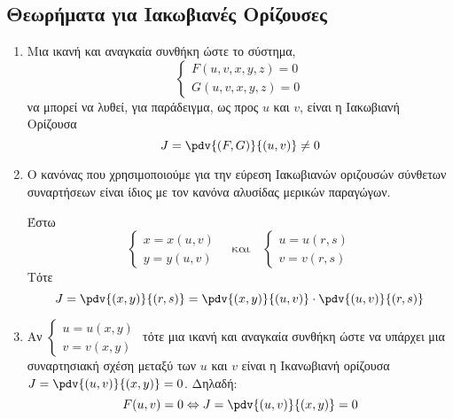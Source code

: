 \documentclass[a4paper,table]{report}
\begin{document}
\subsection{Θεωρήματα για Ιακωβιανές Ορίζουσες}

\begin{enumerate}
  \item Μια ικανή και αναγκαία συνθήκη ώστε το σύστημα, 
    \[
      \begin{cases}
        F(u,v,x,y,z) = 0 \\
        G(u,v,x,y,z) = 0
      \end{cases}
    \]
    να μπορεί να λυθεί, για παράδειγμα, ως προς 
    $u$ και $v$, είναι η Ιακωβιανή Ορίζουσα
    \[
      J = \pdv{(F,G)}{(u,v)} \neq 0 
    \] 

  \item Ο κανόνας που χρησιμοποιούμε για την εύρεση 
    Ιακωβιανών οριζουσών σύνθετων συναρτήσεων είναι 
    ίδιος με τον κανόνα αλυσίδας μερικών παραγώγων.

    Έστω 
    \[
      \begin{cases} x=x(u,v) \\
      y=y(u,v)\end{cases} \quad \text{και} \quad 
      \begin{cases} 
        u = u(r,s) \\
        v=v(r,s) 
      \end{cases} 
    \] 
    Τότε
    \[
      J = \pdv{(x,y)}{(r,s)} = \pdv{(x,y)}{(u,v)} \cdot \pdv{(u,v)}{(r,s)}  
    \] 
  \item Αν $ \begin{cases} u=u(x,y) \\ v=v(x,y) \end{cases} $ τότε μια ικανή 
    και αναγκαία συνθήκη ώστε να υπάρχει μια συναρτησιακή σχέση μεταξύ των 
    $ u $ και $v $ είναι η Ικανωβιανή ορίζουσα $ J = \pdv{(u,v)}{(x,y)} = 0 $.
    Δηλαδή:
    \[
      F(u,v)=0 \Leftrightarrow J = \pdv{(u,v)}{(x,y)} = 0 
    \] 
\end{enumerate}
\end{document}
